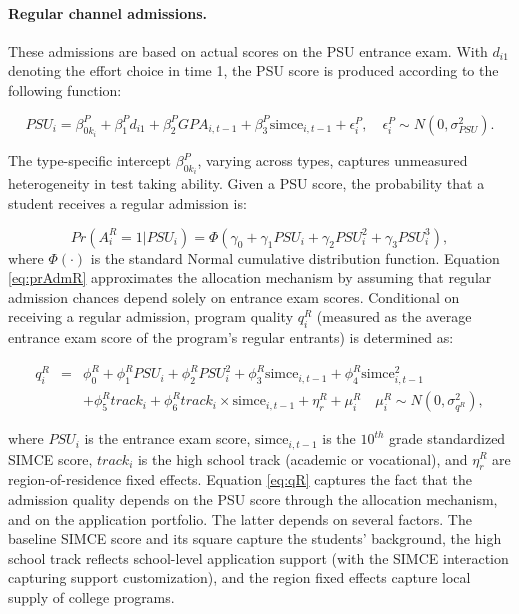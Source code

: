 \paragraph{Regular channel admissions.} These admissions are based on actual scores on the PSU entrance exam. With $d_{i1}$ denoting the effort choice in time 1, the PSU score is produced according to the following function: 

\begin{equation}\label{eq:PSU}
    PSU_i=\beta^P_{0k_i}+\beta^P_{1}d_{i1}+\beta^P_2 GPA_{i,t-1}+\beta^P_3 \mbox{simce}_{i,t-1} +\epsilon_i^P, \quad \epsilon_i^P\sim N(0,\sigma^2_{PSU}).
\end{equation}

\noindent The type-specific intercept $\beta^P_{0k_i}$, varying across types, captures unmeasured heterogeneity in test taking ability. Given a PSU score, the probability that a student receives a regular admission is:

\begin{equation}\label{eq:prAdmR}
    Pr(A^R_i=1|PSU_i)=\Phi(\gamma_0+\gamma_1 PSU_i + \gamma_2 PSU^2_i+\gamma_3 PSU_i^3),
\end{equation}
 where $\Phi(\cdot)$ is the standard Normal cumulative distribution function. Equation \eqref{eq:prAdmR} approximates the allocation mechanism by assuming that regular admission chances depend solely on entrance exam scores. Conditional on receiving a regular admission, program quality $q^R_i$ (measured as the average entrance exam score of the program's regular entrants) is determined as:

\begin{eqnarray}\label{eq:qR}
    q_i^R&=&\phi^R_0 + \phi^R_1 PSU_i + \phi^R_2 PSU_i^2 + \phi^R_3 \mbox{simce}_{i,t-1}+\phi^R_4 \mbox{simce}_{i,t-1}^2  \\ \nonumber 
    && +\phi^R_5 track_i + \phi^R_6 track_i  \times \mbox{simce}_{i,t-1} + \eta^R_r+\mu^R_i \quad \mu_i^R\sim N(0,\sigma^2_{q^R}),
\end{eqnarray}

\noindent \noindent where $PSU_i$ is the entrance exam score, $\mbox{simce}_{i,t-1}$ is the $10^{th}$ grade standardized SIMCE score, $track_i$ is the high school track (academic or vocational), and $\eta^R_r$ are region-of-residence fixed effects. Equation \eqref{eq:qR} captures the fact that the admission quality depends on the PSU score through the allocation mechanism, and on the application portfolio. The latter depends on several factors. The baseline SIMCE score and its square capture the students' background, the high school track reflects school-level application support (with the SIMCE interaction capturing support customization), and the region fixed effects capture local supply of college programs.\par 





